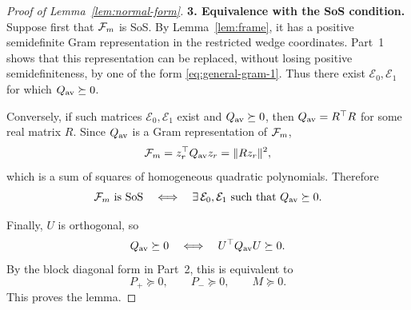 \begin{proof}[Proof of Lemma~\ref{lem:normal-form}]
\medskip
\noindent
\textbf{3. Equivalence with the SoS condition.}
Suppose first that $\mathcal{F}_m$ is SoS.  By Lemma~\ref{lem:frame}, it has a
positive semidefinite Gram representation in the restricted wedge
coordinates.  Part~1 shows that this representation can be replaced,
without losing positive semidefiniteness, by one of the form
\eqref{eq:general-gram-1}.  Thus there exist
$\mathcal E_0,\mathcal E_1$ for which $Q_{\rm av}\succeq0$.

Conversely, if such matrices $\mathcal E_0,\mathcal E_1$ exist and
$Q_{\rm av}\succeq0$, then
$
Q_{\rm av}=R^\top R
$
for some real matrix $R$.  Since $Q_{\rm av}$ is a Gram representation
of $\mathcal{F}_m$,
\[
 \mathcal{F}_m
 =z_r^\top Q_{\rm av}z_r
 =\|Rz_r\|^2,
\]
which is a sum of squares of homogeneous quadratic polynomials.
Therefore
\[
 \mathcal{F}_m\text{ is SoS}
 \quad\Longleftrightarrow\quad
 \exists\,\mathcal E_0,\mathcal E_1
 \text{ such that }Q_{\rm av}\succeq0.
\]

Finally, $U$ is orthogonal, so
\[
 Q_{\rm av}\succeq0
 \quad\Longleftrightarrow\quad
 U^\top Q_{\rm av}U\succeq0.
\]
By the block diagonal form in Part~2, this is equivalent to
\[
                         P_+\succeq0,\qquad
                         P_-\succeq0,\qquad
                         M\succeq0.
\]
This proves the lemma.
\end{proof}